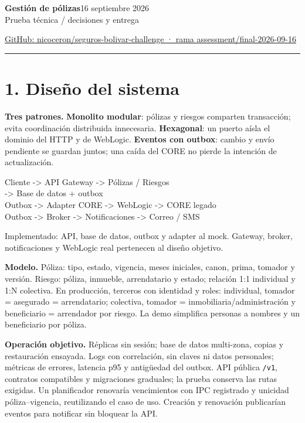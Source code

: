 \documentclass[11pt,a4paper]{article}
\newcommand{\tagline}[1]{\textbf{#1}\enspace}
\begin{document}
{\LARGE\bfseries\color{ink}Gestión de pólizas}\hfill{\small 16 septiembre 2026}\\[4pt]
{\large Prueba técnica \; / \; decisiones y entrega}\par
\href{https://github.com/nicoceron/seguros-bolivar-challenge/tree/assessment/final-2026-09-16}{\small GitHub: nicoceron/seguros-bolivar-challenge · rama assessment/final-2026-09-16}
\vspace{3pt}\hrule\vspace{3pt}

\section{1. Diseño del sistema}
\tagline{Tres patrones.} \textbf{Monolito modular}: pólizas y riesgos comparten transacción; evita coordinación distribuida innecesaria. \textbf{Hexagonal}: un puerto aísla el dominio del HTTP y de WebLogic. \textbf{Eventos con outbox}: cambio y envío pendiente se guardan juntos; una caída del CORE no pierde la intención de actualización.

\begin{center}\small\ttfamily
Cliente -> API Gateway -> Pólizas / Riesgos\\
\hspace*{5em}-> Base de datos + outbox\\
Outbox -> Adapter CORE -> WebLogic -> CORE legado\\
Outbox -> Broker -> Notificaciones -> Correo / SMS
\end{center}
{\small\color{muted}Implementado: API, base de datos, outbox y adapter al mock. Gateway, broker, notificaciones y WebLogic real pertenecen al diseño objetivo.}

\tagline{Modelo.} Póliza: tipo, estado, vigencia, meses iniciales, canon, prima, tomador y versión. Riesgo: póliza, inmueble, arrendatario y estado; relación 1:1 individual y 1:N colectiva. En producción, terceros con identidad y roles: individual, tomador = asegurado = arrendatario; colectiva, tomador = inmobiliaria/administración y beneficiario = arrendador por riesgo. La demo simplifica personas a nombres y un beneficiario por póliza.

\tagline{Operación objetivo.} Réplicas sin sesión; base de datos multi-zona, copias y restauración ensayada. Logs con correlación, sin claves ni datos personales; métricas de errores, latencia p95 y antigüedad del outbox. API pública \texttt{/v1}, contratos compatibles y migraciones graduales; la prueba conserva las rutas exigidas. Un planificador renovaría vencimientos con IPC registrado y unicidad póliza--vigencia, reutilizando el caso de uso. Creación y renovación publicarían eventos para notificar sin bloquear la API.
\end{document}
